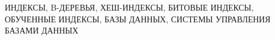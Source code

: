 \begin{essay}{}
    \noindent\mbox{ИНДЕКСЫ,} \mbox{B-ДЕРЕВЬЯ,} \mbox{ХЕШ-ИНДЕКСЫ,}
    \mbox{БИТОВЫЕ} \mbox{ИНДЕКСЫ,} \mbox{ОБУЧЕННЫЕ} \mbox{ИНДЕКСЫ,} \mbox{БАЗЫ}
    \mbox{ДАННЫХ,} \mbox{СИСТЕМЫ} \mbox{УПРАВЛЕНИЯ} \mbox{БАЗАМИ} \mbox{ДАННЫХ}
\end{essay}
